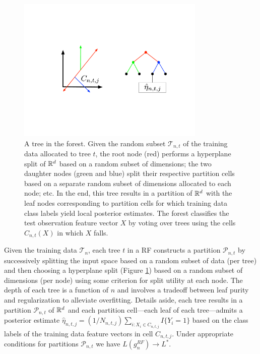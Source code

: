 \begin{figure}[htb]
\centering
\includegraphics[width=0.8\textwidth]{figures/forest}
  \caption{A tree in the forest.
  Given the random subset $\mathcal{T}_{n,t}$ of the training data allocated to tree $t$, the root node (red) performs a hyperplane split of $\mathbb{R}^d$ based on a random subset of dimensions;
  the two daughter nodes (green and blue) split their respective partition cells based on a separate random subset of dimensions allocated to each node; etc.
  In the end, this tree results in a partition of $\mathbb{R}^d$ with the leaf nodes corresponding to partition cells for which training data class labels yield local posterior estimates.
  The forest classifies the test observation feature vector $X$ by voting over trees using the cells $C_{n,t}(X)$ in which $X$ falls.
  }
\label{fig:forest}
\end{figure}

Given the training data $\mathcal{T}_n$, each tree $t$ in a RF constructs a partition $\mathcal{P}_{n,t}$ by successively splitting the input space based on a random subset of data (per tree) and then choosing a hyperplane split (Figure \ref{fig:forest}) based on a random subset of dimensions (per node) using some criterion for split utility at each node. The depth of each tree is a function of $n$ and involves a tradeoff between leaf purity and regularization to alleviate overfitting.
Details aside, each tree results in a partition $\mathcal{P}_{n,t}$ of $\mathbb{R}^d$
and each partition cell---each leaf of each tree---admits a posterior estimate $\widehat{\eta}_{n,t,j} = (1 / N_{n,t,j}) \sum_{i: X_i \in C_{n,t,j}} I\{Y_i=1\}$ based on the class labels of the training data feature vectors in cell $C_{n,t,j}$.
Under appropriate conditions for partitions $\mathcal{P}_{n,t}$ we have $L(g^{RF}_n) \to L^*$.

